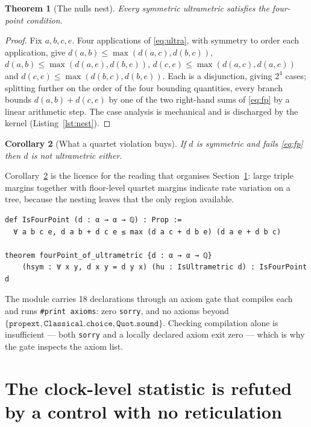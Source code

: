 \documentclass[11pt,a4paper]{article}
\newtheorem{theorem}{Theorem}[section]
\newtheorem{corollary}[theorem]{Corollary}
\theoremstyle{definition}
\theoremstyle{remark}
\begin{document}
\begin{theorem}[The nulls nest]\label{thm:nest}
Every symmetric ultrametric satisfies the four-point condition.
\end{theorem}

\begin{proof}
Fix $a,b,c,e$. Four applications of \eqref{eq:ultra}, with symmetry to order each
application, give $d(a,b) \le \max(d(a,c), d(b,c))$,
$d(a,b) \le \max(d(a,e), d(b,e))$, $d(c,e) \le \max(d(a,c), d(a,e))$ and
$d(c,e) \le \max(d(b,c), d(b,e))$. Each is a disjunction, giving $2^4$ cases;
splitting further on the order of the four bounding quantities, every branch
bounds $d(a,b)+d(c,e)$ by one of the two right-hand sums of \eqref{eq:fp} by a
linear arithmetic step. The case analysis is mechanical and is discharged by the
kernel (Listing~\ref{lst:nest}).
\end{proof}

\begin{corollary}[What a quartet violation buys]\label{cor:q}
If $d$ is symmetric and fails \eqref{eq:fp} then $d$ is not ultrametric either.
\end{corollary}

Corollary~\ref{cor:q} is the licence for the reading that organises
Section~\ref{sec:refute}: large triple margins together with floor-level quartet
margins indicate rate variation on a tree, because the nesting leaves that the
only region available.

\begin{lstlisting}[caption={\texttt{formal/ANSE/GeneticaReticulataTree.lean}. The
\texttt{rcases} chain is the $2^4$ case split, with four further splits on the
order of the bounding quantities.},label={lst:nest}]
def IsFourPoint (d : α → α → ℚ) : Prop :=
  ∀ a b c e, d a b + d c e ≤ max (d a c + d b e) (d a e + d b c)

theorem fourPoint_of_ultrametric {d : α → α → ℚ}
    (hsym : ∀ x y, d x y = d y x) (hu : IsUltrametric d) : IsFourPoint d
\end{lstlisting}

The module carries 18 declarations through an axiom gate that compiles each and
runs \texttt{\#print axioms}: zero \texttt{sorry}, and no axioms beyond
$\{\texttt{propext}, \texttt{Classical.choice}, \texttt{Quot.sound}\}$. Checking
compilation alone is insufficient --- both \texttt{sorry} and a locally declared
axiom exit zero --- which is why the gate inspects the axiom list.

\section{The clock-level statistic is refuted by a control with no reticulation}
\label{sec:refute}
\end{document}
